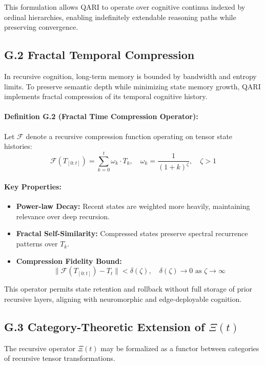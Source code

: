\documentclass[12pt]{article}
\begin{document}
\begin{itemize}
This formulation allows QARI to operate over cognitive continua indexed by ordinal hierarchies, enabling indefinitely extendable reasoning paths while preserving convergence.

\subsection*{G.2 Fractal Temporal Compression}

In recursive cognition, long-term memory is bounded by bandwidth and entropy limits. To preserve semantic depth while minimizing state memory growth, QARI implements fractal compression of its temporal cognitive history.

\paragraph{Definition G.2 (Fractal Time Compression Operator):}
Let \( \mathcal{F} \) denote a recursive compression function operating on tensor state histories:
\[
\mathcal{F}(T_{[0:t]}) = \sum_{k=0}^{t} \omega_k \cdot T_k, \quad \omega_k = \frac{1}{(1+k)^\zeta}, \quad \zeta > 1
\]

\paragraph{Key Properties:}
\begin{itemize}
    \item \textbf{Power-law Decay:} Recent states are weighted more heavily, maintaining relevance over deep recursion.
    \item \textbf{Fractal Self-Similarity:} Compressed states preserve spectral recurrence patterns over \( T_k \).
    \item \textbf{Compression Fidelity Bound:}
    \[
    \| \mathcal{F}(T_{[0:t]}) - T_t \| < \delta(\zeta), \quad \delta(\zeta) \to 0 \text{ as } \zeta \to \infty
    \]
\end{itemize}

This operator permits state retention and rollback without full storage of prior recursive layers, aligning with neuromorphic and edge-deployable cognition.

\subsection*{G.3 Category-Theoretic Extension of \( \Xi(t) \)}

The recursive operator \( \Xi(t) \) may be formalized as a functor between categories of recursive tensor transformations.


\end{itemize}
\end{document}
